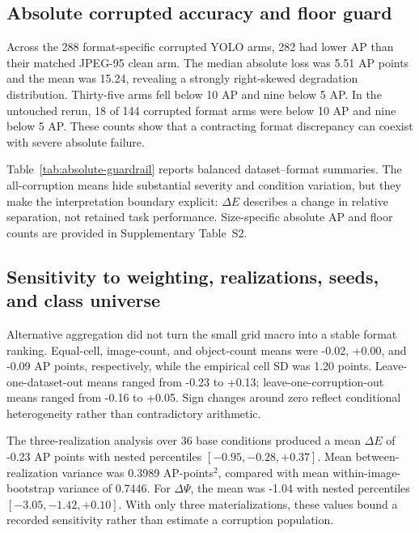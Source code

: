 \subsection{Absolute corrupted accuracy and floor guard}
\label{sec:absolute-results}

Across the 288 format-specific corrupted YOLO arms, 282 had lower AP than their
matched JPEG-95 clean arm. The median absolute loss was 5.51 AP points and the
mean was 15.24, revealing a strongly right-skewed degradation distribution.
Thirty-five arms fell below 10 AP and nine below 5 AP. In the untouched rerun,
18 of 144 corrupted format arms were below 10 AP and nine below 5 AP. These
counts show that a contracting format discrepancy can coexist with severe
absolute failure.

Table~\ref{tab:absolute-guardrail} reports balanced dataset--format summaries.
The all-corruption means hide substantial severity and condition variation, but
they make the interpretation boundary explicit: $\Delta E$ describes a change
in relative separation, not retained task performance. Size-specific absolute
AP and floor counts are provided in Supplementary Table~S2.

\begin{table}[t]
\centering
\caption{Absolute-accuracy guardrail from the validated YOLO metric ledger.
$D=\AP_{95}-\AP_c$; rows are balanced descriptive summaries, not pooled
leaderboard scores.}
\label{tab:absolute-guardrail}
\small

\end{table}

\subsection{Sensitivity to weighting, realizations, seeds, and class universe}
\label{sec:sensitivity-results}

Alternative aggregation did not turn the small grid macro into a stable format
ranking. Equal-cell, image-count, and object-count means were -0.02, +0.00, and
-0.09 AP points, respectively, while the empirical cell SD was 1.20 points.
Leave-one-dataset-out means ranged from -0.23 to +0.13; leave-one-corruption-out
means ranged from -0.16 to +0.05. Sign changes around zero reflect conditional
heterogeneity rather than contradictory arithmetic.

The three-realization analysis over 36 base conditions produced a mean
$\Delta E$ of -0.23 AP points with nested percentiles
$[-0.95,-0.28,+0.37]$. Mean between-realization variance was 0.3989
AP-points$^2$, compared with mean within-image-bootstrap variance of 0.7446.
For $\Delta\Psi$, the mean was -1.04 with nested percentiles
$[-3.05,-1.42,+0.10]$. With only three materializations, these values bound a
recorded sensitivity rather than estimate a corruption population.

